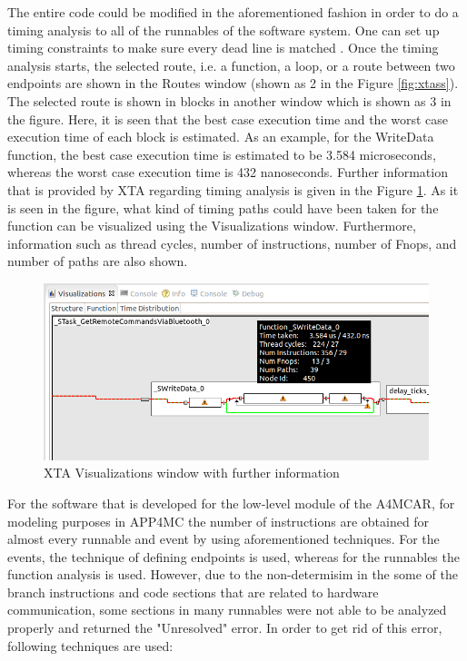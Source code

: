 The entire code could be modified in the aforementioned fashion in order to do a timing analysis to all of the runnables of the software system. One can set up timing constraints to make sure every dead line is matched \cite{xtamanual}. Once the timing analysis starts, the selected route, i.e. a function, a loop, or a route between two endpoints are shown in the Routes window (shown as 2 in the Figure \ref{fig:xtass}). The selected route is shown in blocks in another window which is shown as 3 in the figure. Here, it is seen that the best case execution time and the worst case execution time of each block is estimated. As an example, for the WriteData function, the best case execution time is estimated to be 3.584 microseconds, whereas the worst case execution time is 432 nanoseconds. Further information that is provided by XTA regarding timing analysis is given in the Figure \ref{fig:xtafurther}. As it is seen in the figure, what kind of timing paths could have been taken for the function can be visualized using the Visualizations window. Furthermore, information such as thread cycles, number of instructions, number of Fnops, and number of paths are also shown.

\begin{figure}[!ht]
	\centering
	\captionsetup{justification=centering}
	\includegraphics[width=\textwidth]{content/images/xtafurther.png}
	\caption{XTA Visualizations window with further information}
	\label{fig:xtafurther}
\end{figure}

For the software that is developed for the low-level module of the A4MCAR, for modeling purposes in APP4MC  the number of instructions are obtained for almost every runnable and event by using aforementioned techniques. For the events, the technique of defining endpoints is used, whereas for the runnables the function analysis is used. However, due to the non-determisim in the some of the branch instructions and code sections that are related to hardware communication, some sections in many runnables were not able to be analyzed properly and returned the "Unresolved" error. In order to get rid of this error, following techniques are used:

